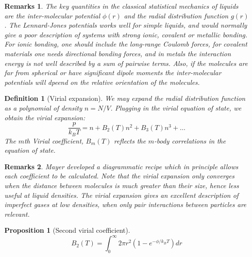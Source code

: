 \documentclass[a4paper]{article}
\newtheorem{remarks}{Remarks}[section]
\theoremstyle{new}
\newtheorem{defi}{Definition}[section]
\newtheorem{prop}{Proposition}[section]
\begin{document}
\begin{remarks}
The key quantities in the classical statistical mechanics of liquids are the inter-molecular potential $\phi(r)$ and the radial distribution function $g(r)$. The Lennard-Jones potentials works well for simple liquids, and would normally give a poor description of systems with strong ionic, covalent or metallic bonding. For ionic bonding, one should include the long-range Coulomb forces, for covalent materials one needs directional bonding forces, and in metals the interaction energy is not well described by a sum of pairwise terms. Also, if the molecules are far from spherical or have significant dipole moments the inter-molecular potentials will dpeend on the relative orientation of the molecules.
\end{remarks}
\begin{defi}[Virial expansion]
We may expand the radial distribution function as a polynomial of density $n=N/V$. Plugging in the virial equation of state, we obtain the virial expansion:
$$\frac{p}{k_BT}=n+B_2(T)n^2+B_3(T)n^3+\dots$$
The $m$th Virial coefficient, $B_m(T)$ reflects the $m$-body correlations in the equation of state.
\end{defi}
\begin{remarks}
Mayer developed a diagrammatic recipe which in principle allows each coefficient to be calculated. Note that the virial expansion only converges when the distance between molecules is much greater than their size, hence less useful at liquid densities. The virial expansion gives an excellent description of imperfect gases at low densities, when only pair interactions between particles are relevant. 
\end{remarks}
\begin{prop}[Second virial coefficient]
$$B_2(T)=\int_0^\infty2\pi r^2(1-e^{-\phi/k_BT})dr$$
\end{prop}
\end{document}
